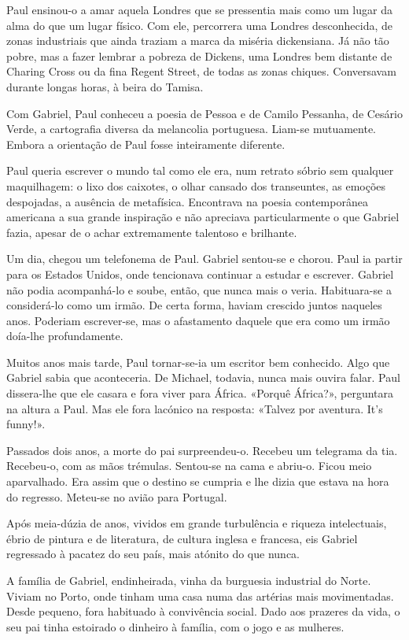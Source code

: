 Paul ensinou-o a amar aquela Londres que se pressentia mais como um
lugar da alma do que um lugar físico. Com ele, percorrera uma Londres
desconhecida, de zonas industriais que ainda traziam a marca da miséria
dickensiana. Já não tão pobre, mas a fazer lembrar a pobreza de Dickens,
uma Londres bem distante de Charing Cross ou da fina Regent Street, de
todas as zonas chiques. Conversavam durante longas horas, à beira do
Tamisa.

Com Gabriel, Paul conheceu a poesia de Pessoa e de Camilo Pessanha, de
Cesário Verde, a cartografia diversa da melancolia portuguesa. Liam-se
mutuamente. Embora a orientação de Paul fosse inteiramente diferente.

Paul queria escrever o mundo tal como ele era, num retrato sóbrio sem
qualquer maquilhagem: o lixo dos caixotes, o olhar cansado dos
transeuntes, as emoções despojadas, a ausência de metafísica. Encontrava
na poesia contemporânea americana a sua grande inspiração e não
apreciava particularmente o que Gabriel fazia, apesar de o achar
extremamente talentoso e brilhante.

Um dia, chegou um telefonema de Paul. Gabriel sentou-se e chorou. Paul
ia partir para os Estados Unidos, onde tencionava continuar a estudar e
escrever. Gabriel não podia acompanhá-lo e soube, então, que nunca mais
o veria. Habituara-se a considerá-lo como um irmão. De certa forma,
haviam crescido juntos naqueles anos. Poderiam escrever-se, mas o
afastamento daquele que era como um irmão doía-lhe profundamente.

Muitos anos mais tarde, Paul tornar-se-ia um escritor bem conhecido.
Algo que Gabriel sabia que aconteceria. De Michael, todavia, nunca mais
ouvira falar. Paul dissera-lhe que ele casara e fora viver para África.
«Porquê África?», perguntara na altura a Paul. Mas ele fora lacónico na
resposta: «Talvez por aventura. It's funny!».

Passados dois anos, a morte do pai surpreendeu-o. Recebeu um telegrama
da tia. Recebeu-o, com as mãos trémulas. Sentou-se na cama e abriu-o.
Ficou meio aparvalhado. Era assim que o destino se cumpria e lhe dizia
que estava na hora do regresso. Meteu-se no avião para Portugal.

Após meia-dúzia de anos, vividos em grande turbulência e riqueza
intelectuais, ébrio de pintura e de literatura, de cultura inglesa e
francesa, eis Gabriel regressado à pacatez do seu país, mais atónito do
que nunca.

A família de Gabriel, endinheirada, vinha da burguesia industrial do
Norte. Viviam no Porto, onde tinham uma casa numa das artérias mais
movimentadas. Desde pequeno, fora habituado à convivência social. Dado
aos prazeres da vida, o seu pai tinha estoirado o dinheiro à família,
com o jogo e as mulheres.

